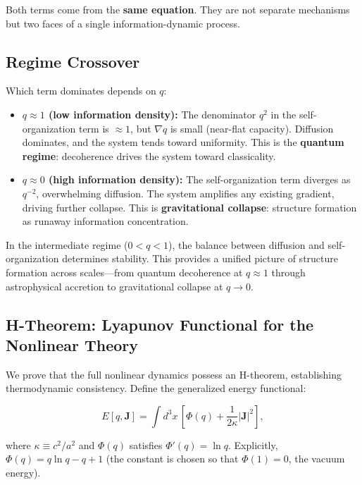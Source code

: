 \documentclass[aps,prd,twocolumn,showpacs,superscriptaddress,preprintnumbers]{revtex4-2}
\begin{document}
Both terms come from the \textbf{same equation}.
They are not separate mechanisms but two faces of a single information-dynamic process.

\subsection{Regime Crossover}

Which term dominates depends on $q$:

\begin{itemize}
    \item \textbf{$q\approx1$ (low information density):} The denominator $q^2$ in the self-organization term is $\approx1$, but $\nabla q$ is small (near-flat capacity). Diffusion dominates, and the system tends toward uniformity. This is the \textbf{quantum regime}: decoherence drives the system toward classicality.

    \item \textbf{$q\approx0$ (high information density):} The self-organization term diverges as $q^{-2}$, overwhelming diffusion. The system amplifies any existing gradient, driving further collapse. This is \textbf{gravitational collapse}: structure formation as runaway information concentration.
\end{itemize}

In the intermediate regime ($0<q<1$), the balance between diffusion and self-organization determines stability.
This provides a unified picture of structure formation across scales---from quantum decoherence at $q\approx1$ through astrophysical accretion to gravitational collapse at $q\to0$.

\subsection{H-Theorem: Lyapunov Functional for the Nonlinear Theory}

\label{sec:lyapunov}

We prove that the full nonlinear dynamics possess an H-theorem, establishing thermodynamic consistency.
Define the generalized energy functional:

\begin{equation}
E[q,\mathbf{J}] = \int d^3x\,\left[\Phi(q) + \frac{1}{2\kappa}|\mathbf{J}|^2\right],
\label{eq:lyapunov_E}
\end{equation}

where $\kappa\equiv c^2/a^2$ and $\Phi(q)$ satisfies $\Phi'(q)=\ln q$.
Explicitly, $\Phi(q)=q\ln q - q + 1$ (the constant is chosen so that $\Phi(1)=0$, the vacuum energy).
\end{document}
